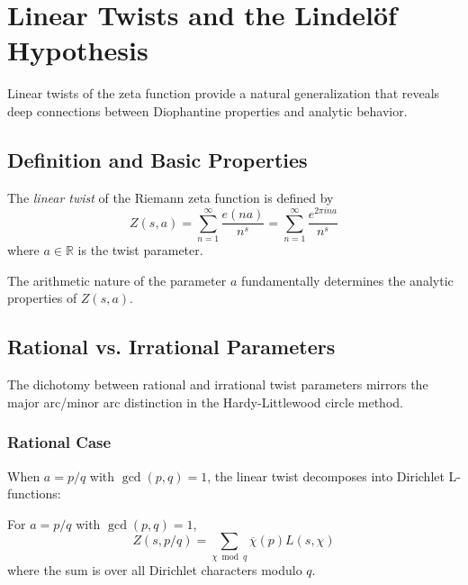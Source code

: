 \section{Linear Twists and the Lindelöf Hypothesis}
\label{sec:linear_twists}

Linear twists of the zeta function provide a natural generalization that reveals deep connections between Diophantine properties and analytic behavior.

\subsection{Definition and Basic Properties}

\begin{definition}
The \emph{linear twist} of the Riemann zeta function is defined by
\begin{equation}
Z(s,a) = \sum_{n=1}^{\infty} \frac{e(na)}{n^s} = \sum_{n=1}^{\infty} \frac{e^{2\pi i na}}{n^s}
\end{equation}
where $a \in \mathbb{R}$ is the twist parameter.
\end{definition}

The arithmetic nature of the parameter $a$ fundamentally determines the analytic properties of $Z(s,a)$.

\subsection{Rational vs. Irrational Parameters}

The dichotomy between rational and irrational twist parameters mirrors the major arc/minor arc distinction in the Hardy-Littlewood circle method.

\subsubsection{Rational Case}

When $a = p/q$ with $\gcd(p,q) = 1$, the linear twist decomposes into Dirichlet L-functions:

\begin{proposition}
For $a = p/q$ with $\gcd(p,q) = 1$,
\begin{equation}
Z(s, p/q) = \sum_{\chi \bmod q} \overline{\chi}(p) L(s, \chi)
\end{equation}
where the sum is over all Dirichlet characters modulo $q$.
\end{proposition}

